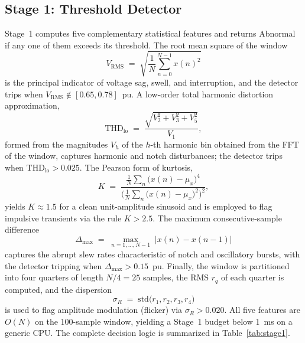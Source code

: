 \documentclass[conference]{IEEEtran}
\begin{document}
\subsection{Stage 1: Threshold Detector}\label{sec:stage1}
Stage~1 computes five complementary statistical features and returns
Abnormal if any one of them exceeds its threshold. The root mean
square of the window
\begin{equation}
  V_{\mathrm{RMS}} \;=\; \sqrt{\frac{1}{N}\sum_{n=0}^{N-1} x(n)^{2}}
  \label{eq:rms}
\end{equation}
is the principal indicator of voltage sag, swell, and interruption,
and the detector trips when $V_{\mathrm{RMS}} \notin [0.65, 0.78]$~pu.
A low-order total harmonic distortion approximation,
\begin{equation}
  \mathrm{THD}_{\mathrm{lo}} \;=\;
  \frac{\sqrt{V_2^{2} + V_3^{2} + V_5^{2}}}{V_1},
  \label{eq:thd}
\end{equation}
formed from the magnitudes $V_h$ of the $h$-th harmonic bin obtained
from the FFT of the window, captures harmonic and notch disturbances;
the detector trips when $\mathrm{THD}_{\mathrm{lo}} > 0.025$. The
Pearson form of kurtosis,
\begin{equation}
  K \;=\;
  \frac{\frac{1}{N}\sum_{n}\bigl(x(n)-\mu_x\bigr)^{4}}
       {\bigl(\frac{1}{N}\sum_{n}\bigl(x(n)-\mu_x\bigr)^{2}\bigr)^{2}},
  \label{eq:kurt}
\end{equation}
yields $K \approx 1.5$ for a clean unit-amplitude sinusoid and is
employed to flag impulsive transients via the rule $K > 2.5$. The
maximum consecutive-sample difference
\begin{equation}
  \Delta_{\max} \;=\;
  \max_{n=1,\ldots,N-1}\;\bigl|x(n) - x(n-1)\bigr|
  \label{eq:dmax}
\end{equation}
captures the abrupt slew rates characteristic of notch and
oscillatory bursts, with the detector tripping when
$\Delta_{\max} > 0.15$~pu. Finally, the window is partitioned into
four quarters of length $N/4 = 25$ samples, the RMS $r_q$ of each
quarter is computed, and the dispersion
\begin{equation}
  \sigma_R \;=\; \mathrm{std}\bigl(r_1, r_2, r_3, r_4\bigr)
  \label{eq:qrms}
\end{equation}
is used to flag amplitude modulation (flicker) via $\sigma_R > 0.020$.
All five features are $O(N)$ on the 100-sample window, yielding a
Stage~1 budget below 1~ms on a generic CPU. The complete decision
logic is summarized in Table~\ref{tab:stage1}.
\end{document}

